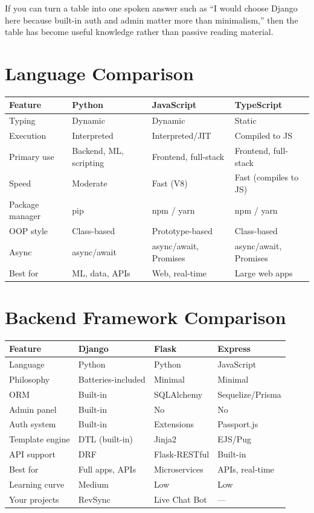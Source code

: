 \documentclass[12pt, a4paper, oneside]{book}
\begin{document}
\begin{notebox}
If you can turn a table into one spoken answer such as ``I would choose Django here because built-in auth and admin matter more than minimalism,'' then the table has become useful knowledge rather than passive reading material.
\end{notebox}

\section{Language Comparison}

\begin{center}
\begin{tabular}{l l l l}
\toprule
\textbf{Feature} & \textbf{Python} & \textbf{JavaScript} & \textbf{TypeScript} \\
\midrule
Typing & Dynamic & Dynamic & Static \\
Execution & Interpreted & Interpreted/JIT & Compiled to JS \\
Primary use & Backend, ML, scripting & Frontend, full-stack & Frontend, full-stack \\
Speed & Moderate & Fast (V8) & Fast (compiles to JS) \\
Package manager & pip & npm / yarn & npm / yarn \\
OOP style & Class-based & Prototype-based & Class-based \\
Async & async/await & async/await, Promises & async/await, Promises \\
Best for & ML, data, APIs & Web, real-time & Large web apps \\
\bottomrule
\end{tabular}
\end{center}

\section{Backend Framework Comparison}

\begin{center}
\begin{tabular}{l l l l}
\toprule
\textbf{Feature} & \textbf{Django} & \textbf{Flask} & \textbf{Express} \\
\midrule
Language & Python & Python & JavaScript \\
Philosophy & Batteries-included & Minimal & Minimal \\
ORM & Built-in & SQLAlchemy & Sequelize/Prisma \\
Admin panel & Built-in & No & No \\
Auth system & Built-in & Extensions & Passport.js \\
Template engine & DTL (built-in) & Jinja2 & EJS/Pug \\
API support & DRF & Flask-RESTful & Built-in \\
Best for & Full apps, APIs & Microservices & APIs, real-time \\
Learning curve & Medium & Low & Low \\
Your projects & RevSync & Live Chat Bot & --- \\
\bottomrule
\end{tabular}
\end{center}
\end{document}
